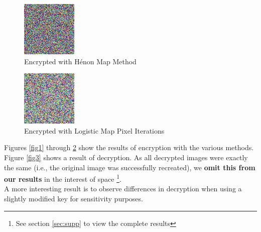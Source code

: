 \documentclass[10pt]{article}
\begin{document}
    \begin{figure}[htbp]
        \centering
        \includegraphics[width=0.5\columnwidth]{HenonDinoEncrypted.png}
        \caption{Encrypted with Hénon Map Method}
        \label{fig5}
    \end{figure}
    
    
    \begin{figure}[htbp]
        \centering
        \includegraphics[width=0.5\columnwidth]{LMapPixelDinoEncrypted.png}
        \caption{Encrypted with Logistic Map Pixel Iterations}
        \label{fig6}
    \end{figure}


	Figures \ref{fig1} through \ref{fig6} show the results of encryption with the various methods. Figure \ref{fig3} shows a result of decryption. As all decrypted images were exactly the same (i.e., the original image was successfully recreated), we \textbf{omit this from our results} in the interest of space \footnote{See section \ref{sec:supp} to view the complete results}.\\
	
	A more interesting result is to observe differences in decryption when using a slightly modified key for sensitivity purposes. \\
	
\end{document}
